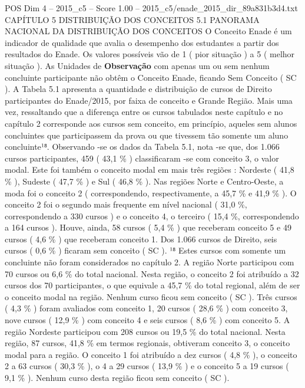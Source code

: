 \begin{textsample}{POS Dim 4 – 2015\_c5 – Score 1.00 – 2015\_c5/enade\_2015\_dir\_89a831b3d4.txt}  \label{ex:f4_pos_164}
CAPÍTULO 5 DISTRIBUIÇÃO DOS CONCEITOS 5.1 PANORAMA NACIONAL DA DISTRIBUIÇÃO DOS CONCEITOS O Conceito Enade é um indicador de qualidade que avalia o desempenho dos estudantes a partir dos resultados do Enade.
Os valores possíveis vão de 1 ( pior situação ) a 5 ( melhor situação ).
As Unidades de \textbf{Observação} com apenas um ou sem nenhum concluinte participante não obtêm o Conceito Enade, ficando Sem Conceito ( SC ).
A Tabela 5.1 apresenta a quantidade e distribuição de cursos de Direito participantes do Enade/2015, por faixa de conceito e Grande Região.
Mais uma vez, ressaltando que a diferença entre os cursos tabulados neste capítulo e no capítulo 2 corresponde aos cursos sem conceito, em princípio, aqueles sem alunos concluintes que participassem da prova ou que tivessem tão somente um aluno concluinte¹⁸.
Observando -se os dados da Tabela 5.1, nota -se que, dos 1.066 cursos participantes, 459 ( 43,1 \% ) classificaram -se com conceito 3, o valor modal.
Este foi também o conceito modal em mais três regiões : Nordeste ( 41,8 \% ), Sudeste ( 47,7 \% ) e Sul ( 46,8 \% ).
Nas regiões Norte e Centro-Oeste, a moda foi o conceito 2 ( correspondendo, respectivamente, a 45,7 \% e 41,9 \% ).
O conceito 2 foi o segundo mais frequente em nível nacional ( 31,0 \%, correspondendo a 330 cursos ) e o conceito 4, o terceiro ( 15,4 \%, correspondendo a 164 cursos ).
Houve, ainda, 58 cursos ( 5,4 \% ) que receberam conceito 5 e 49 cursos ( 4,6 \% ) que receberam conceito 1.
Dos 1.066 cursos de Direito, seis cursos ( 0,6 \% ) ficaram sem conceito ( SC ). ¹⁸ Estes cursos com somente um concluinte não foram considerados no capítulo 2.
A região Norte participou com 70 cursos ou 6,6 \% do total nacional.
Nesta região, o conceito 2 foi atribuído a 32 cursos dos 70 participantes, o que equivale a 45,7 \% do total regional, além de ser o conceito modal na região.
Nenhum curso ficou sem conceito ( SC ).
Três cursos ( 4,3 \% ) foram avaliados com conceito 1, 20 cursos ( 28,6 \% ) com conceito 3, nove cursos ( 12,9 \% ) com conceito 4 e seis cursos ( 8,6 \% ) com conceito 5.
A região Nordeste participou com 208 cursos ou 19,5 \% do total nacional.
Nesta região, 87 cursos, 41,8 \% em termos regionais, obtiveram conceito 3, o conceito modal para a região.
O conceito 1 foi atribuído a dez cursos ( 4,8 \% ), o conceito 2 a 63 cursos ( 30,3 \% ), o 4 a 29 cursos ( 13,9 \% ) e o conceito 5 a 19 cursos ( 9,1 \% ).
Nenhum curso desta região ficou sem conceito ( SC ).

\end{textsample}
